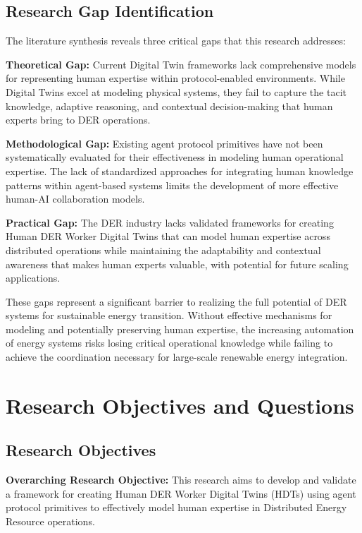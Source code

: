\documentclass[12pt,a4paper]{article}
\begin{document}
\subsection{Research Gap Identification}

The literature synthesis reveals three critical gaps that this research addresses:

\textbf{Theoretical Gap:} Current Digital Twin frameworks lack comprehensive models for representing human expertise within protocol-enabled environments. While Digital Twins excel at modeling physical systems, they fail to capture the tacit knowledge, adaptive reasoning, and contextual decision-making that human experts bring to DER operations.

\textbf{Methodological Gap:} Existing agent protocol primitives have not been systematically evaluated for their effectiveness in modeling human operational expertise. The lack of standardized approaches for integrating human knowledge patterns within agent-based systems limits the development of more effective human-AI collaboration models.

\textbf{Practical Gap:} The DER industry lacks validated frameworks for creating Human DER Worker Digital Twins that can model human expertise across distributed operations while maintaining the adaptability and contextual awareness that makes human experts valuable, with potential for future scaling applications.

These gaps represent a significant barrier to realizing the full potential of DER systems for sustainable energy transition. Without effective mechanisms for modeling and potentially preserving human expertise, the increasing automation of energy systems risks losing critical operational knowledge while failing to achieve the coordination necessary for large-scale renewable energy integration.

\section{Research Objectives and Questions}
\label{sec:objectives}

\subsection{Research Objectives}

\textbf{Overarching Research Objective:} This research aims to develop and validate a framework for creating Human DER Worker Digital Twins (HDTs) using agent protocol primitives to effectively model human expertise in Distributed Energy Resource operations.
\end{document}
